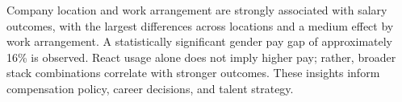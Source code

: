 Company location and work arrangement are strongly associated with salary outcomes, with the largest differences across locations and a medium effect by work arrangement. A statistically significant gender pay gap of approximately 16\% is observed. React usage alone does not imply higher pay; rather, broader stack combinations correlate with stronger outcomes. These insights inform compensation policy, career decisions, and talent strategy.
